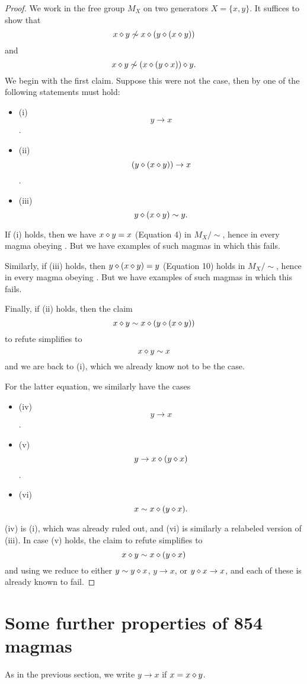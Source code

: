 \begin{proof}
  We work in the free group $M_X$ on two generators $X = \{x,y\}$.  It suffices to show that
$$  x \diamond y \not \sim x \diamond (y \diamond (x \diamond y))$$
and
$$
x \diamond y \not \sim (x \diamond (y \diamond x)) \diamond y.$$
We begin with the first claim.  Suppose this were not the case, then by  one of the following statements must hold:
\begin{itemize}
\item (i) $$y \to x$$.
\item (ii) $$(y \diamond (x \diamond y)) \to x$$.
\item (iii) $$y \diamond (x \diamond y) \sim y.$$
\end{itemize}
If (i) holds, then we have $x \diamond y = x$ (Equation 4) in $M_X/\sim$, hence in every magma obeying .  But we have examples of such magmas in which this fails.

Similarly, if (iii) holds, then $y \diamond (x \diamond y) = y$ (Equation 10) holds in $M_X/\sim$, hence in every magma obeying .  But we have examples of such magmas in which this fails.

Finally, if (ii) holds, then the claim
$$  x \diamond y \sim x \diamond (y \diamond (x \diamond y))$$
to refute simplifies to
$$  x \diamond y \sim x$$
and we are back to (i), which we already know not to be the case.

For the latter equation, we similarly have the cases
\begin{itemize}
  \item (iv) $$y \to x$$.
  \item (v) $$y \to x \diamond (y \diamond x)$$.
  \item (vi) $$x \sim x \diamond (y \diamond x).$$
  \end{itemize}
(iv) is (i), which was already ruled out, and (vi) is similarly a relabeled version of (iii). In case (v) holds, the claim to refute simplifies to
$$
x \diamond y \sim x \diamond (y \diamond x)$$
and using  we reduce to either $y \sim y \diamond x$, $y \to x$, or $y \diamond x \to x$, and each of these is already known to fail.
\end{proof}

\section{Some further properties of 854 magmas}

As in the previous section, we write $y \to x$ if $x = x \diamond y$.

